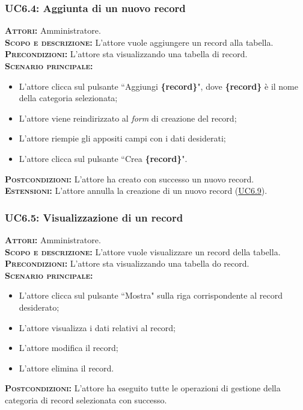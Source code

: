 \subsubsection{UC6.4: Aggiunta di un nuovo record}
\label{sec:UC64}
\textsc{\textbf{Attori:}} Amministratore.\\
\textsc{\textbf{Scopo e descrizione:}} L'attore vuole aggiungere un record alla tabella.\\
\textsc{\textsc{\textbf{Precondizioni:}}} L'attore sta visualizzando una tabella di record.\\
\textsc{\textbf{Scenario principale:}} 
\begin{itemize}
    \item L'attore clicca sul pulsante ``Aggiungi \textbf{\{record\}}", dove \textbf{\{record\}} è il nome della categoria selezionata;
    \item L'attore viene reindirizzato al \textit{form} di creazione del record;
    \item L'attore riempie gli appositi campi con i dati desiderati;
    \item L'attore clicca sul pulsante ``Crea \textbf{\{record\}}".
\end{itemize}
\textsc{\textbf{Postcondizioni:}} L'attore ha creato con successo un nuovo record.\\
\textsc{\textbf{Estensioni:}} L'attore annulla la creazione di un nuovo record (\hyperref[sec:UC69]{UC6.9}).

\subsubsection{UC6.5: Visualizzazione di un record}
\label{sec:UC65}
\textsc{\textbf{Attori:}} Amministratore.\\
\textsc{\textbf{Scopo e descrizione:}} L'attore vuole visualizzare un record della tabella.\\
\textsc{\textsc{\textbf{Precondizioni:}}} L'attore sta visualizzando una tabella do record.\\
\textsc{\textbf{Scenario principale:}} 
\begin{itemize}
    \item L'attore clicca sul pulsante ``Mostra" sulla riga corrispondente al record desiderato;
    \item L'attore visualizza i dati relativi al record;
    \item L'attore modifica il record;
    \item L'attore elimina il record.
\end{itemize}
\textsc{\textbf{Postcondizioni:}} L'attore ha eseguito tutte le operazioni di gestione della categoria di record selezionata con successo.

